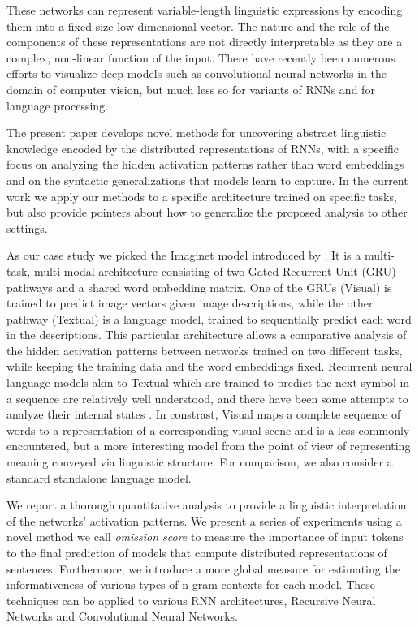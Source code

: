 These networks can represent variable-length linguistic expressions by
encoding them into a fixed-size low-dimensional vector. The nature and
the role of the components of these representations are not directly
interpretable as they are a complex, non-linear function of the
input. There have recently been numerous efforts to visualize deep
models such as convolutional neural networks in the domain of computer
vision, but much less so for variants of RNNs and for language
processing.
 
The present paper develops novel methods for uncovering abstract
linguistic knowledge encoded by the distributed representations of RNNs,
with a specific focus on analyzing the hidden activation patterns rather 
than word embeddings and on the syntactic generalizations 
that models learn to capture. In the current work we apply our methods
to a specific architecture trained on specific tasks, but also provide
pointers about how to generalize the proposed analysis to other settings.

As our case study we picked the {\sc Imaginet} model introduced by \label{explainimaginet}
. It is a multi-task, multi-modal
architecture consisting of two Gated-Recurrent Unit (GRU)
\cite{cho2014properties,chung2014empirical} pathways and
a shared word embedding matrix. One of the GRUs ({\sc Visual}) is
trained to predict image vectors given image descriptions, while the other
pathway ({\sc Textual}) is a language model, trained to sequentially predict each
word in the descriptions. This particular
architecture allows a comparative analysis of the hidden activation
patterns between networks trained on two different tasks, while
keeping the training data and the word embeddings fixed. Recurrent neural
language models akin to {\sc Textual} which are trained to predict the
next symbol in a sequence are relatively well understood, and there
have been some attempts to analyze their internal states 
\cite[among others]{elman1991distributed,karpathy2015visualizing}. In
constrast, {\sc Visual} maps a complete sequence of words to
a representation of a corresponding visual scene and is a less
commonly encountered, but a more interesting model from the point of
view of representing meaning conveyed via linguistic structure.
For comparison, we also consider a standard standalone language model.

We report a thorough quantitative analysis to provide a linguistic 
interpretation of the networks' activation patterns. We present a 
series of experiments using a novel method we call \emph{omission score} 
to measure the importance of input tokens to the final prediction of models 
that compute distributed representations of sentences. 
Furthermore, we introduce a more global measure for estimating the 
informativeness of various types of n-gram contexts for each model.
These techniques can be applied to various RNN architectures, Recursive 
Neural Networks and Convolutional Neural Networks. 

